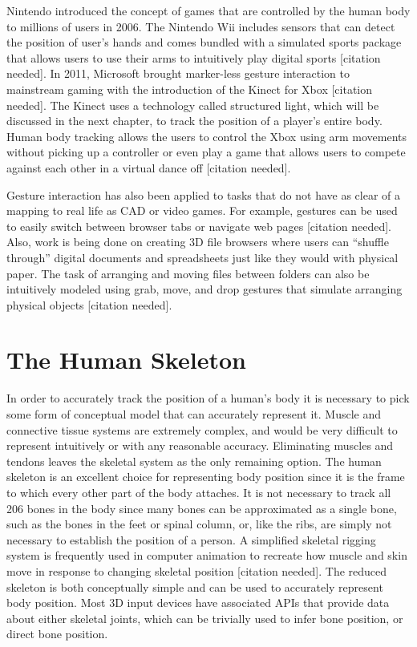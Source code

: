 Nintendo introduced the concept of games that are controlled by the human body to millions of users in 2006. The Nintendo Wii includes sensors that can detect the position of user’s hands and comes bundled with a simulated sports package that allows users to use their arms to intuitively play digital sports [citation needed]. In 2011, Microsoft brought marker-less gesture interaction to mainstream gaming with the introduction of the Kinect for Xbox [citation needed]. The Kinect uses a technology called structured light, which will be discussed in the next chapter, to track the position of a player’s entire body. Human body tracking allows the users to control the Xbox using arm movements without picking up a controller or even play a game that allows users to compete against each other in a virtual dance off [citation needed].

Gesture interaction has also been applied to tasks that do not have as clear of a mapping to real life as CAD or video games. For example, gestures can be used to easily switch between browser tabs or navigate web pages [citation needed]. Also, work is being done on creating 3D file browsers where users can “shuffle through” digital documents and spreadsheets just like they would with physical paper. The task of arranging and moving files between folders can also be intuitively modeled using grab, move, and drop gestures that simulate arranging physical objects [citation needed].

\section{The Human Skeleton}

In order to accurately track the position of a human’s body it is necessary to pick some form of conceptual model that can accurately represent it. Muscle and connective tissue systems are extremely complex, and would be very difficult to represent intuitively or with any reasonable accuracy. Eliminating muscles and tendons leaves the skeletal system as the only remaining option. The human skeleton is an excellent choice for representing body position since it is the frame to which every other part of the body attaches. It is not necessary to track all 206 bones in the body since many bones can be approximated as a single bone, such as the bones in the feet or spinal column, or, like the ribs, are simply not necessary to establish the position of a person. A simplified skeletal rigging system is frequently used in computer animation to recreate how muscle and skin move in response to changing skeletal position [citation needed]. The reduced skeleton is both conceptually simple and can be used to accurately represent body position. Most 3D input devices have associated APIs that provide data about either skeletal joints, which can be trivially used to infer bone position, or direct bone position.

